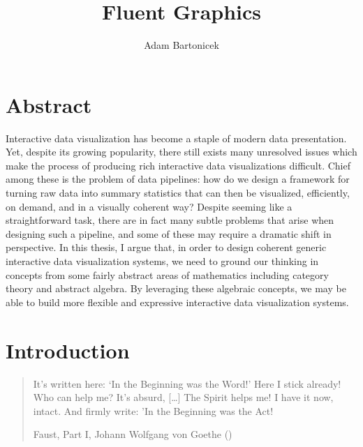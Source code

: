 \documentclass[
]{book}
\title{Fluent Graphics}
\author{Adam Bartonicek}
\date{}
\begin{document}
\maketitle

{
\setcounter{tocdepth}{1}
\tableofcontents
}
\chapter{Abstract}\label{abstract}

Interactive data visualization has become a staple of modern data presentation. Yet, despite its growing popularity, there still exists many unresolved issues which make the process of producing rich interactive data visualizations difficult. Chief among these is the problem of data pipelines: how do we design a framework for turning raw data into summary statistics that can then be visualized, efficiently, on demand, and in a visually coherent way? Despite seeming like a straightforward task, there are in fact many subtle problems that arise when designing such a pipeline, and some of these may require a dramatic shift in perspective. In this thesis, I argue that, in order to design coherent generic interactive data visualization systems, we need to ground our thinking in concepts from some fairly abstract areas of mathematics including category theory and abstract algebra. By leveraging these algebraic concepts, we may be able to build more flexible and expressive interactive data visualization systems.

\newcommand\then{⨾}

\chapter{Introduction}\label{introduction}

\begin{quote}
It's written here: `In the Beginning was the Word!'
Here I stick already! Who can help me? It's absurd,
{[}\ldots{]}
The Spirit helps me! I have it now, intact.
And firmly write: 'In the Beginning was the Act!

Faust, Part I, Johann Wolfgang von Goethe ()
\end{quote}
\end{document}

